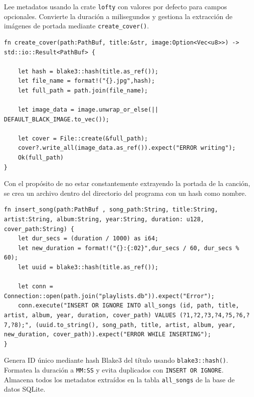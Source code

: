 \documentclass[11pt, a4paper]{article}
\begin{document}
            Lee metadatos usando la crate \texttt{lofty} con valores por defecto para campos opcionales. Convierte la duración a milisegundos y gestiona la extracción de imágenes de portada mediante \texttt{create\_cover()}.

            \begin{lstlisting}[caption={fn create\_cover()}]
fn create_cover(path:PathBuf, title:&str, image:Option<Vec<u8>>) -> std::io::Result<PathBuf> {

    let hash = blake3::hash(title.as_ref());
    let file_name = format!("{}.jpg",hash);
    let full_path = path.join(file_name);

    let image_data = image.unwrap_or_else(|| DEFAULT_BLACK_IMAGE.to_vec());

    let cover = File::create(&full_path);
    cover?.write_all(image_data.as_ref()).expect("ERROR writing");
    Ok(full_path)
}
            \end{lstlisting}

            Con el propósito de no estar constantemente extrayendo la portada de la canción, se crea un archivo dentro del directorio del programa con un hash como nombre.

            \begin{lstlisting}[caption={fn insert\_song()}]
fn insert_song(path:PathBuf , song_path:String, title:String, artist:String, album:String, year:String, duration: u128, cover_path:String) {
    let dur_secs = (duration / 1000) as i64;
    let new_duration = format!("{}:{:02}",dur_secs / 60, dur_secs % 60);
    let uuid = blake3::hash(title.as_ref());

    let conn = Connection::open(path.join("playlists.db")).expect("Error");
    conn.execute("INSERT OR IGNORE INTO all_songs (id, path, title, artist, album, year, duration, cover_path) VALUES (?1,?2,?3,?4,?5,?6,?7,?8);", (uuid.to_string(), song_path, title, artist, album, year, new_duration, cover_path)).expect("ERROR WHILE INSERTING");
}
            \end{lstlisting}

            Genera ID único mediante hash Blake3 del título usando \texttt{blake3::hash()}. Formatea la duración a \texttt{MM:SS} y evita duplicados con \texttt{INSERT OR IGNORE}. Almacena todos los metadatos extraídos en la tabla \texttt{all\_songs} de la base de datos SQLite.
\end{document}
